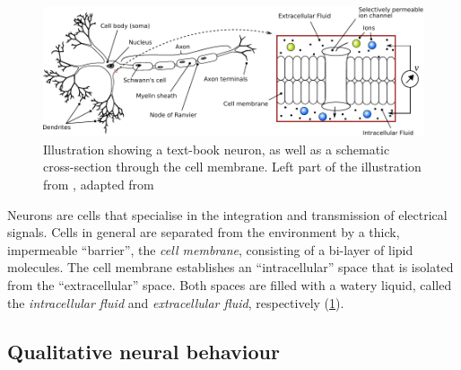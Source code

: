 \documentclass[10pt,letterpaper,oneside]{article}
\begin{document}

\begin{figure}[t]
	\centering
	\includegraphics{media/neuron_sketch_membrane.pdf}
	\caption{Illustration showing a text-book neuron, as well as a schematic cross-section through the cell membrane. Left part of the illustration from \cite{stoeckel2015design}, adapted from \cite{kandel2012principles}}
	\label{fig:neuron_sketch_membrane}
\end{figure}

Neurons are cells that specialise in the integration and transmission of electrical signals. Cells in general are separated from the environment by a thick, impermeable \enquote{barrier}, the \emph{cell membrane}, consisting of a bi-layer of lipid molecules. The cell membrane establishes an \enquote{intracellular} space that is isolated from the \enquote{extracellular} space. Both spaces are filled with a watery liquid, called the \emph{intracellular fluid} and \emph{extracellular fluid}, respectively (\cref{fig:neuron_sketch_membrane}).

\subsection{Qualitative neural behaviour}
\end{document}
